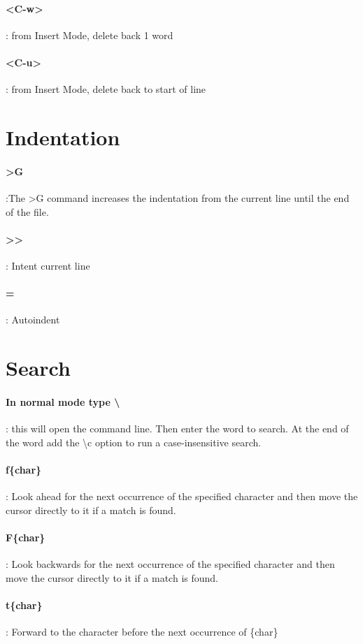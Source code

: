 \documentclass[10pt,letterpaper]{book}
\begin{document}
\paragraph{<C-w>}: from Insert Mode, delete back 1 word
\paragraph{<C-u>}: from Insert Mode, delete back to start of line
\section{Indentation}
\paragraph{>G}:The >G command increases the indentation from the current line until the end of the file.
\paragraph{>>}: Intent current line
\paragraph{=}: Autoindent
\section{Search}
\paragraph{In normal mode type \textbackslash}: this will open the command line. Then enter the word to search. At the end of the word add the \textbackslash c option to run a case-insensitive search.

\paragraph{f\{char\}}: Look ahead for the next occurrence of the specified character and then move the cursor directly to it if a match is found.
\paragraph{F\{char\}}: Look backwards for the next occurrence of the specified character and then move the cursor directly to it if a match is found.
\paragraph{t\{char\}}: Forward to the character before the next occurrence of \{char\}
\end{document}
